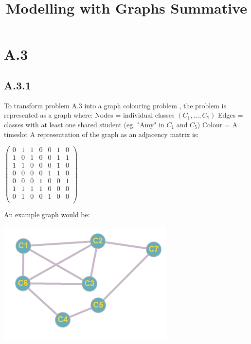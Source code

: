 \documentclass{article}
\title{Modelling with Graphs Summative }
\begin{document}
\maketitle
\newpage
\section*{A.3}
\subsection*{A.3.1}
To transform problem A.3 into a graph colouring problem , the problem is represented as a graph where:
\newline
Nodes = individual classes $(C_1,..., C_7)$
\newline
Edges = classes with at least one shared student (eg. "Amy" in $C_1$ and $C_5$)
\newline
Colour = A timeslot
\newline
A representation of the graph as an adjacency matrix is:
\newline
\begin{center}
$\begin{pmatrix}
   0&1&1&0&0&1&0\\
   1&0&1&0&0&1&1\\
   1&1&0&0&0&1&0\\
   0&0&0&0&1&1&0\\
   0&0&0&1&0&0&1\\
   1&1&1&1&0&0&0\\
   0&1&0&0&1&0&0\\
\end{pmatrix}$
\newline
\end{center}
An example graph would be:
\newline
\begin{center}
\includegraphics{a31NC}
\newline
\end{center}
\end{document}
